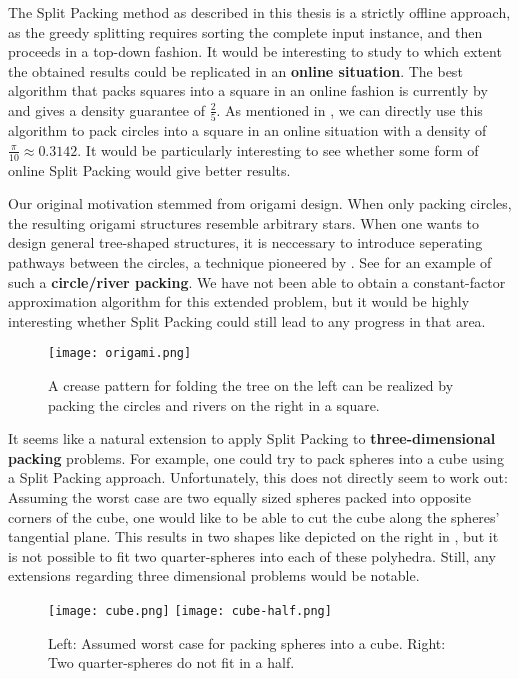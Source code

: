 \documentclass[a4paper,style=print,oneside,bibliography=totoc,nexus,lnum,extramargin]{tubsbook}
\begin{document}
The Split Packing method as described in this thesis is a strictly offline approach, as the greedy splitting requires sorting the complete input instance, and then proceeds in a top-down fashion. It would be interesting to study to which extent the obtained results could be replicated in an \textbf{online situation}. The best algorithm that packs squares into a square in an online fashion is currently by \textcite{brubach2014improved} and gives a density guarantee of $\frac{2}{5}$. As mentioned in , we can directly use this algorithm to pack circles into a square in an online situation with a density of $\frac{\pi}{10} \approx 0.3142$. It would be particularly interesting to see whether some form of online Split Packing would give better results.

Our original motivation stemmed from origami design. When only packing circles, the resulting origami structures resemble arbitrary stars. When one wants to design general tree-shaped structures, it is neccessary to introduce seperating pathways between the circles, a technique pioneered by \textcite{lang1996computational}. See  for an example of such a \textbf{circle/river packing}. We have not been able to obtain a constant-factor approximation algorithm for this extended problem, but it would be highly interesting whether Split Packing could still lead to any progress in that area.

\begin{figure}
    \texttt{[image: origami.png]}
    \caption{A crease pattern for folding the tree on the left can be realized by packing the circles and rivers on the right in a square.}\label{fig:origami}
\end{figure}

It seems like a natural extension to apply Split Packing to \textbf{three-dimensional packing} problems. For example, one could try to pack spheres into a cube using a Split Packing approach. Unfortunately, this does not directly seem to work out: Assuming the worst case are two equally sized spheres packed into opposite corners of the cube, one would like to be able to cut the cube along the spheres' tangential plane. This results in two shapes like depicted on the right in , but it is not possible to fit two quarter-spheres into each of these polyhedra. Still, any extensions regarding three dimensional problems would be notable.

\begin{figure}
    \texttt{[image: cube.png]}
    \texttt{[image: cube-half.png]}
    \caption{Left: Assumed worst case for packing spheres into a cube. Right: Two quarter-spheres do not fit in a half.}\label{fig:cube-half}
\end{figure}
\end{document}
